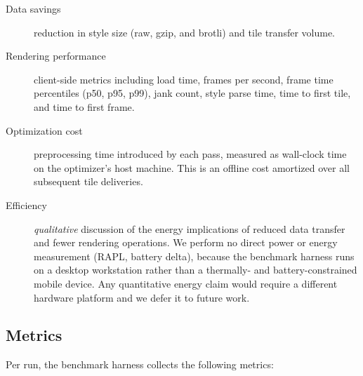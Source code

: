 \begin{description}
    \item[Data savings] reduction in style size (raw, gzip, and brotli) and tile transfer volume.
    \item[Rendering performance] client-side metrics including load time, frames per second, frame time percentiles (p50, p95, p99), jank count, style parse time, time to first tile, and time to first frame.
    \item[Optimization cost] preprocessing time introduced by each pass, measured as wall-clock time on the optimizer's host machine.
    This is an offline cost amortized over all subsequent tile deliveries.
    \item[Efficiency] \emph{qualitative} discussion of the energy implications of reduced data transfer and fewer rendering operations.
    We perform no direct power or energy measurement (\ac{RAPL}, battery delta), because the benchmark harness runs on a desktop workstation rather than a thermally- and battery-constrained mobile device.
    Any quantitative energy claim would require a different hardware platform and we defer it to future work.
\end{description}

\subsection{Metrics}\label{sub:metrics}

Per run, the benchmark harness collects the following metrics:

